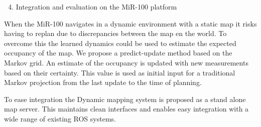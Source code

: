 \begin{enumerate}
    \setcounter{enumi}{3}
    \item Integration and evaluation on the MiR-100 platform
\end{enumerate}
When the MiR-100 navigates in a dynamic environment with a static map it risks having to replan due to discrepancies between the map en the world.
To overcome this the learned dynamics could be used to estimate the expected occupancy of the map.
We propose a predict-update method based on the Markov grid.
An estimate of the occupancy is updated with new measurements based on their certainty.
This value is used as initial input for a traditional Markov projection from the last update to the time of planning.

To ease integration the Dynamic mapping system is proposed as a stand alone map server. 
This maintains clean interfaces and enables easy integration with a wide range of existing ROS systems. 

